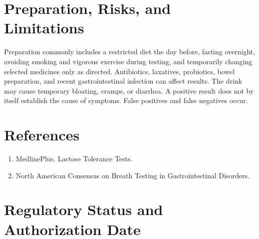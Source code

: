 \section*{Preparation, Risks, and Limitations}
Preparation commonly includes a restricted diet the day before, fasting overnight, avoiding smoking and vigorous exercise during testing, and temporarily changing selected medicines only as directed. Antibiotics, laxatives, probiotics, bowel preparation, and recent gastrointestinal infection can affect results. The drink may cause temporary bloating, cramps, or diarrhea. A positive result does not by itself establish the cause of symptoms. False positives and false negatives occur.

\section*{References}
\begin{enumerate}
  \item MedlinePlus. Lactose Tolerance Tests.
  \item North American Consensus on Breath Testing in Gastrointestinal Disorders.
\end{enumerate}

\clearpage


\section*{Regulatory Status and Authorization Date}

\clearpage
